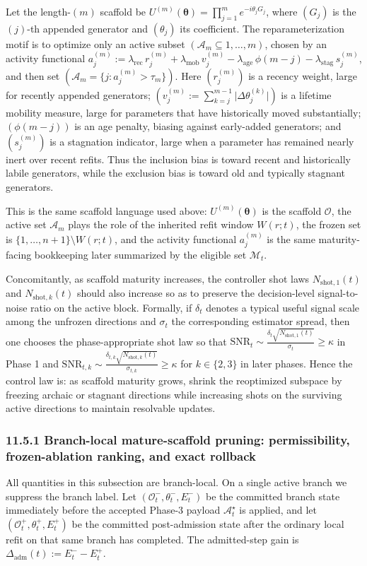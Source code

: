 \documentclass[11pt]{article}
\begin{document}
Let the length-\((m)\) scaffold be \(U^{(m)}(\boldsymbol{\theta})=\prod_{j=1}^{m} e^{-i\theta_j G_j}\), where \((G_j)\) is the \((j)\)-th appended generator and \((\theta_j)\) its coefficient. The reparameterization motif is to optimize only an active subset \((\mathcal A_m\subseteq {1,\dots,m})\), chosen by an activity functional \(a_j^{(m)}:=\lambda_{\mathrm{rec}}\,r_j^{(m)}+\lambda_{\mathrm{mob}}\,v_j^{(m)}-\lambda_{\mathrm{age}}\,\phi(m-j)-\lambda_{\mathrm{stag}}\,s_j^{(m)}\), and then set \((\mathcal A_m=\{j: a_j^{(m)}>\tau_m\})\). Here \((r_j^{(m)})\) is a recency weight, large for recently appended generators; \((v_j^{(m)}:=\sum_{k=j}^{m-1}\lvert \Delta\theta_j^{(k)}\rvert)\) is a lifetime mobility measure, large for parameters that have historically moved substantially; \((\phi(m-j))\) is an age penalty, biasing against early-added generators; and \((s_j^{(m)})\) is a stagnation indicator, large when a parameter has remained nearly inert over recent refits. Thus the inclusion bias is toward recent and historically labile generators, while the exclusion bias is toward old and typically stagnant generators.

This is the same scaffold language used above: \(U^{(m)}(\boldsymbol\theta)\) is the scaffold \(\mathcal O\), the active set \(\mathcal A_m\) plays the role of the inherited refit window \(W(r;t)\), the frozen set is \(\{1,\ldots,n+1\}\setminus W(r;t)\), and the activity functional \(a_j^{(m)}\) is the same maturity-facing bookkeeping later summarized by the eligible set \(\mathcal M_t\).

Concomitantly, as scaffold maturity increases, the controller shot laws \(N_{\mathrm{shot},1}(t)\) and \(N_{\mathrm{shot},k}(t)\) should also increase so as to preserve the decision-level signal-to-noise ratio on the active block. Formally, if \(\delta_t\) denotes a typical useful signal scale among the unfrozen directions and \(\sigma_t\) the corresponding estimator spread, then one chooses the phase-appropriate shot law so that \(\mathrm{SNR}_t\sim \frac{\delta_t\sqrt{N_{\mathrm{shot},1}(t)}}{\sigma_t}\ge \kappa\) in Phase 1 and \(\mathrm{SNR}_{t,k}\sim \frac{\delta_{t,k}\sqrt{N_{\mathrm{shot},k}(t)}}{\sigma_{t,k}}\ge \kappa\) for \(k\in\{2,3\}\) in later phases. Hence the control law is: as scaffold maturity grows, shrink the reoptimized subspace by freezing archaic or stagnant directions while increasing shots on the surviving active directions to maintain resolvable updates.

\subsubsection*{11.5.1 Branch-local mature-scaffold pruning: permissibility, frozen-ablation ranking, and exact rollback}
All quantities in this subsection are branch-local. On a single active branch we suppress the branch label. Let \((\mathcal O_t^-,\theta_t^-,E_t^-)\) be the committed branch state immediately before the accepted Phase-3 payload \(\mathcal A_t^\star\) is applied, and let \((\mathcal O_t^+,\theta_t^+,E_t^+)\) be the committed post-admission state after the ordinary local refit on that same branch has completed. The admitted-step gain is \(\Delta_{\mathrm{adm}}(t):=E_t^- - E_t^+\).
\end{document}
